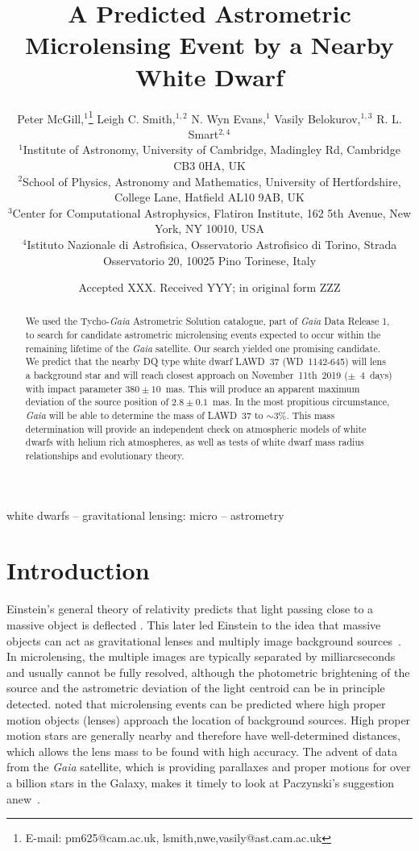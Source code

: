 \documentclass[fleqn,usenatbib]{mnras}
\title[Astrometric Microlensing by LAWD~37]{A Predicted Astrometric Microlensing Event by a Nearby White Dwarf}
\author[P. McGill et al.]{Peter McGill,$^{1}$\thanks{E-mail: pm625@cam.ac.uk, lsmith,nwe,vasily@ast.cam.ac.uk}
Leigh C. Smith,$^{1,2}$
N. Wyn Evans,$^{1}$
Vasily Belokurov,$^{1,3}$
\newauthor R. L. Smart$^{2,4}$
\\
$^{1}$Institute of Astronomy, University of Cambridge, Madingley Rd, Cambridge CB3 0HA, UK\\
$^{2}$School of Physics, Astronomy and Mathematics, University of Hertfordshire, College Lane, Hatfield AL10 9AB, UK\\
$^{3}$Center for Computational Astrophysics, Flatiron Institute, 162 5th Avenue, New York, NY 10010, USA\\
$^{4}$Istituto Nazionale di Astrofisica, Osservatorio Astrofisico di Torino, Strada Osservatorio 20, 10025 Pino Torinese, Italy
}
\date{Accepted XXX. Received YYY; in original form ZZZ}
\newcommand{\Gaia}{{\it Gaia }}
\begin{document}
\label{firstpage}
\pagerange{\pageref{firstpage}--\pageref{lastpage}}
\maketitle

\begin{abstract}
We used the Tycho-\Gaia Astrometric Solution catalogue, part of \Gaia Data Release 1, to search for candidate astrometric microlensing events expected to occur within the remaining lifetime of the {\it Gaia} satellite. Our search yielded one promising candidate. We predict that the nearby DQ type white dwarf LAWD~37 (WD~1142-645) will lens a background star and will reach closest approach on November~11th~2019 ($\pm$~4~days) with impact parameter $380\pm10$~mas. This will produce an apparent maximum deviation of the source position of $2.8\pm0.1$~mas. In the most propitious circumstance, \Gaia will be able to determine the mass of LAWD~37 to $\sim3\%$. This mass determination will provide an independent check on atmospheric models of white dwarfs with helium rich atmospheres, as well as tests of white dwarf mass radius relationships and evolutionary theory.
\end{abstract}
\begin{keywords}
white dwarfs -- gravitational lensing: micro -- astrometry 
\end{keywords}



\section{Introduction}

Einstein's general theory of relativity  predicts that light passing close to a massive object is deflected \citep{Einstein1916}. This later led Einstein to the idea that massive objects can act as gravitational lenses and multiply image background sources~\citep[see e.g.,][for a review]{Schneider1992}. In microlensing, the multiple images are typically separated by milliarcseconds and usually cannot be fully resolved, although the photometric brightening of the source and the astrometric deviation of the light centroid can be in principle detected. \citet{Paczynski1995} noted that microlensing events can be predicted where high proper motion objects (lenses) approach the location of background sources. High proper motion stars are generally nearby and therefore have well-determined distances, which allows the lens mass to be found with high accuracy. The advent of data from the {\it Gaia} satellite, which is providing parallaxes and proper motions for over a billion stars in the Galaxy, makes it timely to look at Paczynski's suggestion anew~\citep[e.g.,][]{Be02,Ha18}.
\end{document}
